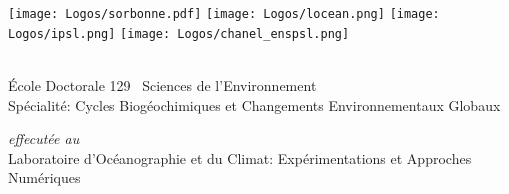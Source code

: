 

\NewDocumentCommand {}

\begin{titlingpage}

\begin{center}
  \def\logosheight{3.2em}
  \texttt{[image: Logos/sorbonne.pdf]}
  \hfill
  \texttt{[image: Logos/locean.png]}
  \hfill
  \texttt{[image: Logos/ipsl.png]}
  \hfill
  \texttt{[image: Logos/chanel\_enspsl.png]}

  \vspace{3.5ex}

  \\
  \vspace{3ex}
  {\normalsize École Doctorale 129 \textendash\ Sciences de l'Environnement\\
  Spécialité: Cycles Biogéochimiques et Changements Environnementaux Globaux}

  \vspace{2ex}

  {\small\textit{effecutée au}}\\
  {\normalsize Laboratoire d'Océanographie et du Climat: Expérimentations et Approches Numériques}


  \parbox{0.9\textwidth}{
    {
      \centering\parskip=0pt
      \xhrulefill[thickness=2pt, height=-0.6ex]\par
    }
  }




\end{center}
\end{titlingpage}

